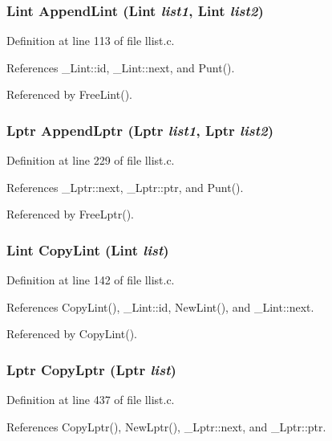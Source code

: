 \subsubsection{\setlength{\rightskip}{0pt plus 5cm}\bf{Lint} Append\-Lint (\bf{Lint} {\em list1}, \bf{Lint} {\em list2})}\label{llist_8c_2179fc2f36a0d9e8b7d5f2516a41d05c}




Definition at line 113 of file llist.c.

References \_\-Lint::id, \_\-Lint::next, and Punt().

Referenced by Free\-Lint().
\subsubsection{\setlength{\rightskip}{0pt plus 5cm}\bf{Lptr} Append\-Lptr (\bf{Lptr} {\em list1}, \bf{Lptr} {\em list2})}\label{llist_8c_3ecac7cf653c91736f83237f705a8be2}




Definition at line 229 of file llist.c.

References \_\-Lptr::next, \_\-Lptr::ptr, and Punt().

Referenced by Free\-Lptr().
\subsubsection{\setlength{\rightskip}{0pt plus 5cm}\bf{Lint} Copy\-Lint (\bf{Lint} {\em list})}\label{llist_8c_726bca829c3a58be74ad11ac03b13900}




Definition at line 142 of file llist.c.

References Copy\-Lint(), \_\-Lint::id, New\-Lint(), and \_\-Lint::next.

Referenced by Copy\-Lint().
\subsubsection{\setlength{\rightskip}{0pt plus 5cm}\bf{Lptr} Copy\-Lptr (\bf{Lptr} {\em list})}\label{llist_8c_bd2cad04e4f5a6a7f7f8de3d99177a66}




Definition at line 437 of file llist.c.

References Copy\-Lptr(), New\-Lptr(), \_\-Lptr::next, and \_\-Lptr::ptr.


